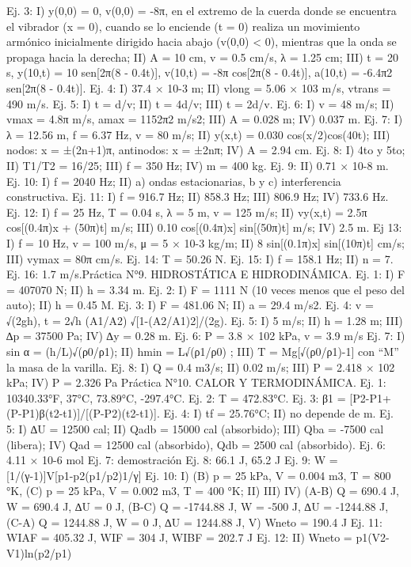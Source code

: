 Ej. 3: I) y(0,0) = 0, v(0,0) = -8π, en el extremo de la cuerda donde se encuentra el vibrador
(x = 0), cuando se lo enciende (t = 0) realiza un movimiento armónico inicialmente dirigido
hacia abajo (v(0,0) < 0), mientras que la onda se propaga hacia la derecha; II) A = 10 cm, v =
0.5 cm/s, λ = 1.25 cm; III) t = 20 s, y(10,t) = 10 sen[2π(8 - 0.4t)], v(10,t) = -8π cos[2π(8 -
0.4t)], a(10,t) = -6.4π2 sen[2π(8 - 0.4t)].
Ej. 4: I) 37.4 × 10-3 m; II) vlong = 5.06 × 103 m/s, vtrans = 490 m/s.
Ej. 5: I) t = d/v; II) t = 4d/v; III) t = 2d/v.
Ej. 6: I) v = 48 m/s; II) vmax = 4.8π m/s, amax = 1152π2 m/s2; III) A = 0.028 m; IV) 0.037 m.
Ej. 7: I) λ = 12.56 m, f = 6.37 Hz, v = 80 m/s; II) y(x,t) = 0.030 cos(x/2)cos(40t); III) nodos:
x = ±(2n+1)π, antinodos: x = ±2nπ; IV) A = 2.94 cm.
Ej. 8: I) 4to y 5to; II) T1/T2 = 16/25; III) f = 350 Hz; IV) m = 400 kg.
Ej. 9: II) 0.71 × 10-8 m.
Ej. 10: I) f = 2040 Hz; II) a) ondas estacionarias, b y c) interferencia constructiva.
Ej. 11: I) f = 916.7 Hz; II) 858.3 Hz; III) 806.9 Hz; IV) 733.6 Hz.
Ej. 12: I) f = 25 Hz, T = 0.04 s, λ = 5 m, v = 125 m/s; II) vy(x,t) = 2.5π cos[(0.4π)x + (50π)t]
m/s; III) 0.10 cos[(0.4π)x] sin[(50π)t] m/s; IV) 2.5 m.
Ej 13: I) f = 10 Hz, v = 100 m/s, μ = 5 × 10-3 kg/m; II) 8 sin[(0.1π)x] sin[(10π)t] cm/s; III)
vymax = 80π cm/s.
Ej. 14: T = 50.26 N.
Ej. 15: I) f = 158.1 Hz; II) n = 7.
Ej. 16: 1.7 m/s.Práctica N°9. HIDROSTÁTICA E
HIDRODINÁMICA.
Ej. 1: I) F = 407070 N; II) h = 3.34 m.
Ej. 2: I) F = 1111 N (10 veces menos que el peso del auto); II) h = 0.45 M.
Ej. 3: I) F = 481.06 N; II) a = 29.4 m/s2.
Ej. 4: v = √(2gh), t = 2√h (A1/A2) √{[1-(A2/A1)2]/(2g)}.
Ej. 5: I) 5 m/s; II) h = 1.28 m; III) ∆p = 37500 Pa; IV) ∆y = 0.28 m.
Ej. 6: P = 3.8 × 102 kPa, v = 3.9 m/s
Ej. 7: I) sin α = (h/L)√(ρ0/ρ1); II) hmin = L√(ρ1/ρ0) ; III) T = Mg[√(ρ0/ρ1)-1] con “M” la masa de
la varilla.
Ej. 8: I) Q = 0.4 m3/s; II) 0.02 m/s; III) P = 2.418 × 102 kPa; IV) P = 2.326 Pa
Práctica N°10. CALOR Y TERMODINÁMICA.
Ej. 1: 10340.33°F, 37°C, 73.89°C, -297.4°C.
Ej. 2: T = 472.83°C.
Ej. 3: β1 = [P2-P1+(P-P1)β(t2-t1)]/[(P-P2)(t2-t1)].
Ej. 4: I) tf = 25.76°C; II) no depende de m.
Ej. 5: I) ∆U = 12500 cal; II) Qadb = 15000 cal (absorbido); III) Qba = -7500 cal (libera); IV) Qad
= 12500 cal (absorbido), Qdb = 2500 cal (absorbido).
Ej. 6: 4.11 × 10-6 mol
Ej. 7: demostración
Ej. 8: 66.1 J, 65.2 J
Ej. 9: W = [1/(γ-1)]V[p1-p2(p1/p2)1/γ]
Ej. 10: I) (B) p = 25 kPa, V = 0.004 m3, T = 800 °K, (C) p = 25 kPa, V = 0.002 m3, T = 400 °K;
II) III) IV) (A-B) Q = 690.4 J, W = 690.4 J, ∆U = 0 J, (B-C) Q = -1744.88 J, W = -500 J, ∆U =
-1244.88 J, (C-A) Q = 1244.88 J, W = 0 J, ∆U = 1244.88 J, V) Wneto = 190.4 J
Ej. 11: WIAF = 405.32 J, WIF = 304 J, WIBF = 202.7 J
Ej. 12: II) Wneto = p1(V2-V1)ln(p2/p1)